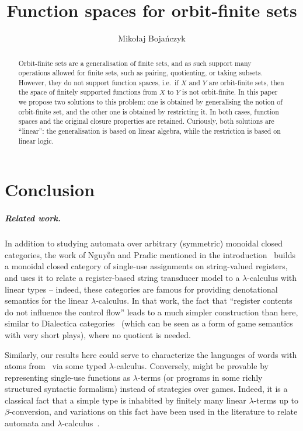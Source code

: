 \documentclass[a4paper,UKenglish,cleveref, autoref, numberwithinsect, thm-restate,anonymous]{lipics-v2021}
\title{Function spaces for orbit-finite sets} %
\author{Miko{\l}aj Boja\'nczyk}{University of Warsaw}{bojan@mimuw.edu.pl}{https://orcid.org/0000-0002-1825-0097}{(Optional) author-specific funding acknowledgements}
\begin{document}
\newcommand{\loli}{\multimap}


\maketitle 
\begin{abstract}
    Orbit-finite sets are a generalisation of finite sets, and as such support many operations allowed for finite sets, such as pairing, quotienting, or taking subsets. However, they do not support function spaces, i.e.~if $X$ and $Y$ are orbit-finite sets, then the space of finitely supported functions from $X$ to $Y$ is not orbit-finite. In this paper we propose two solutions to this problem: one is obtained by generalising the notion of orbit-finite set, and the other one is obtained by restricting it. In both cases, function spaces and the original closure properties are retained. Curiously, both solutions are ``linear'': the generalisation is based on linear algebra, while the restriction is based on linear logic.
\end{abstract}






% 



\section{Conclusion}
\label{sec:conclusion}

\subparagraph{Related work.}

In addition to studying automata over arbitrary (symmetric) monoidal closed categories, the work of Nguy{\~{ê}}n and Pradic mentioned in the introduction~\cite{IATLC2,titoPhD} builds a monoidal closed category of single-use assignments on string-valued registers, and uses it to relate a register-based string transducer model to a $\lambda$-calculus with linear types -- indeed, these categories are famous for providing denotational semantics for the linear $\lambda$-calculus. In that work, the fact that ``register contents do not influence the control flow'' leads to a much simpler construction than here, similar to Dialectica categories~\cite{PaivaDialectica} (which can be seen as a form of game semantics with very short plays), where no quotient is needed.

Similarly, our results here could serve to characterize the languages of words with atoms from~\cite{bojanczykstefanski2020} via some typed $\lambda$-calculus. Conversely,  might be provable by representing single-use functions as $\lambda$-terms (or programs in some richly structured syntactic formalism) instead of strategies over games. Indeed, it is a classical fact that a simple type is inhabited by finitely many linear $\lambda$-terms up to $\beta$-conversion, and variations on this fact have been used in the literature to relate automata and $\lambda$-calculus~\cite{IATLC,LambdaTransducer}.




\appendix






\end{document}
